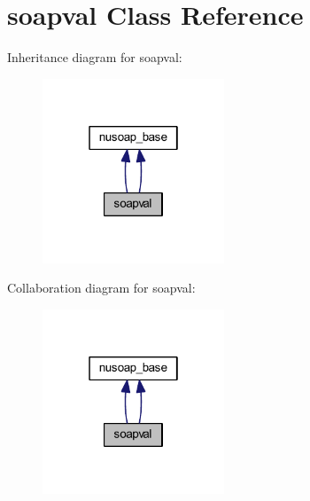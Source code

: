 \hypertarget{classsoapval}{\section{soapval Class Reference}
\label{classsoapval}
}


Inheritance diagram for soapval\-:
\nopagebreak
\begin{figure}[H]
\begin{center}
\leavevmode
\includegraphics[width=154pt]{classsoapval__inherit__graph}
\end{center}
\end{figure}


Collaboration diagram for soapval\-:
\nopagebreak
\begin{figure}[H]
\begin{center}
\leavevmode
\includegraphics[width=154pt]{classsoapval__coll__graph}
\end{center}
\end{figure}

